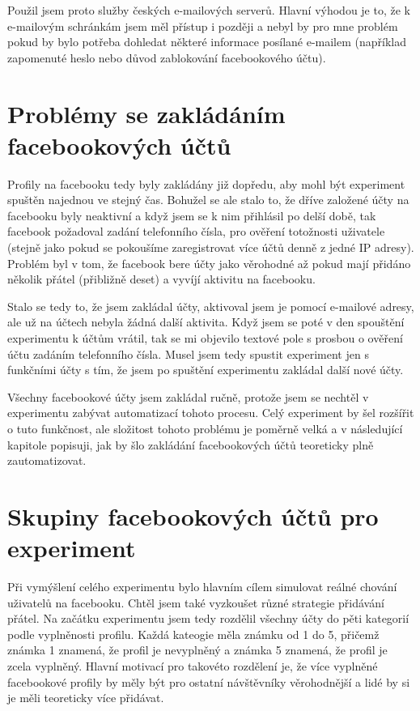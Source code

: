 \documentclass[thesis=M,czech]{FITthesis}[2013/05/10]
\begin{document}
Použil jsem proto služby českých e-mailových serverů. Hlavní výhodou je to, že k e-mailovým schránkám jsem měl přístup i později a nebyl by pro mne problém pokud by bylo potřeba dohledat některé informace posílané e-mailem (například zapomenuté heslo nebo důvod zablokování facebookového účtu).

\section{Problémy se zakládáním facebookových účtů}

Profily na facebooku tedy byly zakládány již dopředu, aby mohl být experiment spuštěn najednou ve stejný čas. Bohužel se ale stalo to, že dříve založené účty na facebooku byly neaktivní a když jsem se k nim přihlásil po delší době, tak facebook požadoval zadání telefonního čísla, pro ověření totožnosti uživatele (stejně jako pokud se pokoušíme zaregistrovat více účtů denně z jedné IP adresy). Problém byl v tom, že facebook bere účty jako věrohodné až pokud mají přidáno několik přátel (přibližně deset) a vyvíjí aktivitu na facebooku. 

Stalo se tedy to, že jsem zakládal účty, aktivoval jsem je pomocí e-mailové adresy, ale už na účtech nebyla žádná další aktivita. Když jsem se poté v den spouštění experimentu k účtům vrátil, tak se mi objevilo textové pole s prosbou o ověření účtu zadáním telefonního čísla. Musel jsem tedy spustit experiment jen s funkčními účty s tím, že jsem po spuštění experimentu zakládal další nové účty.

Všechny facebookové účty jsem zakládal ručně, protože jsem se nechtěl v experimentu zabývat automatizací tohoto procesu. Celý experiment by šel rozšířit o tuto funkčnost, ale složitost tohoto problému je poměrně velká a v následující kapitole popisuji, jak by šlo zakládání facebookových účtů teoreticky plně zautomatizovat.

\section{Skupiny facebookových účtů pro experiment}

Při vymýšlení celého experimentu bylo hlavním cílem simulovat reálné chování uživatelů na facebooku. Chtěl jsem také vyzkoušet různé strategie přidávání přátel. Na začátku experimentu jsem tedy rozdělil všechny účty do pěti kategorií podle vyplněnosti profilu. Každá kateogie měla známku od 1 do 5, přičemž známka 1 znamená, že profil je nevyplněný a známka 5 znamená, že profil je zcela vyplněný. Hlavní motivací pro takovéto rozdělení je, že více vyplněné facebookové profily by měly být pro ostatní návštěvníky věrohodnější a lidé by si je měli teoreticky více přidávat.
\end{document}
